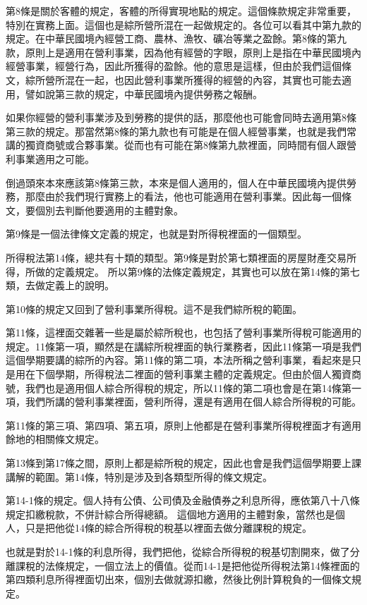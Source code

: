 \documentclass[]{ctexbook}
\begin{document}
第8條是關於客體的規定，客體的所得實現地點的規定。這個條款規定非常重要，特別在實務上面。這個也是綜所營所混在一起做規定的。各位可以看其中第九款的規定。在中華民國境內經營工商、農林、漁牧、礦冶等業之盈餘。第8條的第九款，原則上是適用在營利事業，因為他有經營的字眼，原則上是指在中華民國境內經營事業，經營行為，因此所獲得的盈餘。他的意思是這樣，但由於我們這個條文，綜所營所混在一起，也因此營利事業所獲得的經營的內容，其實也可能去適用，譬如說第三款的規定，中華民國境內提供勞務之報酬。

如果你經營的營利事業涉及到勞務的提供的話，那麼他也可能會同時去適用第8條第三款的規定。那當然第8條的第九款也有可能是在個人經營事業，也就是我們常講的獨資商號或合夥事業。從而也有可能在第8條第九款裡面，同時間有個人跟營利事業適用之可能。

倒過頭來本來應該第8條第三款，本來是個人適用的，個人在中華民國境內提供勞務，那麼由於我們現行實務上的看法，他也可能適用在營利事業。因此每一個條文，要個別去判斷他要適用的主體對象。

第9條是一個法律條文定義的規定，也就是對所得稅裡面的一個類型。

所得稅法第14條，總共有十類的類型。第9條是對於第七類裡面的房屋財產交易所得，所做的定義規定。
所以第9條的法條定義規定，其實也可以放在第14條的第七類，去做定義上的說明。

第10條的規定又回到了營利事業所得稅。這不是我們綜所稅的範圍。

第11條，這裡面交雜著一些是屬於綜所稅也，也包括了營利事業所得稅可能適用的規定。11條第一項，顯然是在講綜所稅裡面的執行業務者，因此11條第一項是我們這個學期要講的綜所的內容。第11條的第二項，本法所稱之營利事業，看起來是只是用在下個學期，所得稅法二裡面的營利事業主體的定義規定。但由於個人獨資商號，我們也是適用個人綜合所得稅的規定，所以11條的第二項也會是在第14條第一項，我們所講的營利事業裡面，營利所得，還是有適用在個人綜合所得稅的可能。

第11條的第三項、第四項、第五項，原則上他都是在營利事業所得稅裡面才有適用餘地的相關條文規定。

第13條到第17條之間，原則上都是綜所稅的規定，因此也會是我們這個學期要上課講解的範圍。第14條，特別是涉及到各類型所得的條文規定。

第14-1條的規定。個人持有公債、公司債及金融債券之利息所得，應依第八十八條規定扣繳稅款，不併計綜合所得總額。
這個地方適用的主體對象，當然也是個人，只是把他從14條的綜合所得稅的稅基以裡面去做分離課稅的規定。

也就是對於14-1條的利息所得，我們把他，從綜合所得稅的稅基切割開來，做了分離課稅的法條規定，一個立法上的價值。從而14-1是把他從所得稅法第14條裡面的第四類利息所得裡面切出來，個別去做就源扣繳，然後比例計算稅負的一個條文規定。
\end{document}
